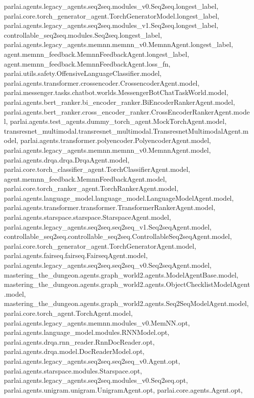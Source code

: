 parlai.\+agents.\+legacy\+\_\+agents.\+seq2seq.\+modules\+\_\+v0.\+Seq2seq.\+longest\+\_\+label, parlai.\+core.\+torch\+\_\+generator\+\_\+agent.\+Torch\+Generator\+Model.\+longest\+\_\+label, parlai.\+agents.\+legacy\+\_\+agents.\+seq2seq.\+modules\+\_\+v1.\+Seq2seq.\+longest\+\_\+label, controllable\+\_\+seq2seq.\+modules.\+Seq2seq.\+longest\+\_\+label, parlai.\+agents.\+legacy\+\_\+agents.\+memnn.\+memnn\+\_\+v0.\+Memnn\+Agent.\+longest\+\_\+label, agent.\+memnn\+\_\+feedback.\+Memnn\+Feedback\+Agent.\+longest\+\_\+label, agent.\+memnn\+\_\+feedback.\+Memnn\+Feedback\+Agent.\+loss\+\_\+fn, parlai.\+utils.\+safety.\+Offensive\+Language\+Classifier.\+model, parlai.\+agents.\+transformer.\+crossencoder.\+Crossencoder\+Agent.\+model, parlai.\+messenger.\+tasks.\+chatbot.\+worlds.\+Messenger\+Bot\+Chat\+Task\+World.\+model, parlai.\+agents.\+bert\+\_\+ranker.\+bi\+\_\+encoder\+\_\+ranker.\+Bi\+Encoder\+Ranker\+Agent.\+model, parlai.\+agents.\+bert\+\_\+ranker.\+cross\+\_\+encoder\+\_\+ranker.\+Cross\+Encoder\+Ranker\+Agent.\+model, parlai.\+agents.\+test\+\_\+agents.\+dummy\+\_\+torch\+\_\+agent.\+Mock\+Torch\+Agent.\+model, transresnet\+\_\+multimodal.\+transresnet\+\_\+multimodal.\+Transresnet\+Multimodal\+Agent.\+model, parlai.\+agents.\+transformer.\+polyencoder.\+Polyencoder\+Agent.\+model, parlai.\+agents.\+legacy\+\_\+agents.\+memnn.\+memnn\+\_\+v0.\+Memnn\+Agent.\+model, parlai.\+agents.\+drqa.\+drqa.\+Drqa\+Agent.\+model, parlai.\+core.\+torch\+\_\+classifier\+\_\+agent.\+Torch\+Classifier\+Agent.\+model, agent.\+memnn\+\_\+feedback.\+Memnn\+Feedback\+Agent.\+model, parlai.\+core.\+torch\+\_\+ranker\+\_\+agent.\+Torch\+Ranker\+Agent.\+model, parlai.\+agents.\+language\+\_\+model.\+language\+\_\+model.\+Language\+Model\+Agent.\+model, parlai.\+agents.\+transformer.\+transformer.\+Transformer\+Ranker\+Agent.\+model, parlai.\+agents.\+starspace.\+starspace.\+Starspace\+Agent.\+model, parlai.\+agents.\+legacy\+\_\+agents.\+seq2seq.\+seq2seq\+\_\+v1.\+Seq2seq\+Agent.\+model, controllable\+\_\+seq2seq.\+controllable\+\_\+seq2seq.\+Controllable\+Seq2seq\+Agent.\+model, parlai.\+core.\+torch\+\_\+generator\+\_\+agent.\+Torch\+Generator\+Agent.\+model, parlai.\+agents.\+fairseq.\+fairseq.\+Fairseq\+Agent.\+model, parlai.\+agents.\+legacy\+\_\+agents.\+seq2seq.\+seq2seq\+\_\+v0.\+Seq2seq\+Agent.\+model, mastering\+\_\+the\+\_\+dungeon.\+agents.\+graph\+\_\+world2.\+agents.\+Model\+Agent\+Base.\+model, mastering\+\_\+the\+\_\+dungeon.\+agents.\+graph\+\_\+world2.\+agents.\+Object\+Checklist\+Model\+Agent.\+model, mastering\+\_\+the\+\_\+dungeon.\+agents.\+graph\+\_\+world2.\+agents.\+Seq2\+Seq\+Model\+Agent.\+model, parlai.\+core.\+torch\+\_\+agent.\+Torch\+Agent.\+model, parlai.\+agents.\+legacy\+\_\+agents.\+memnn.\+modules\+\_\+v0.\+Mem\+N\+N.\+opt, parlai.\+agents.\+language\+\_\+model.\+modules.\+R\+N\+N\+Model.\+opt, parlai.\+agents.\+drqa.\+rnn\+\_\+reader.\+Rnn\+Doc\+Reader.\+opt, parlai.\+agents.\+drqa.\+model.\+Doc\+Reader\+Model.\+opt, parlai.\+agents.\+legacy\+\_\+agents.\+seq2seq.\+seq2seq\+\_\+v0.\+Agent.\+opt, parlai.\+agents.\+starspace.\+modules.\+Starspace.\+opt, parlai.\+agents.\+legacy\+\_\+agents.\+seq2seq.\+modules\+\_\+v0.\+Seq2seq.\+opt, parlai.\+agents.\+unigram.\+unigram.\+Unigram\+Agent.\+opt, parlai.\+core.\+agents.\+Agent.\+opt, 